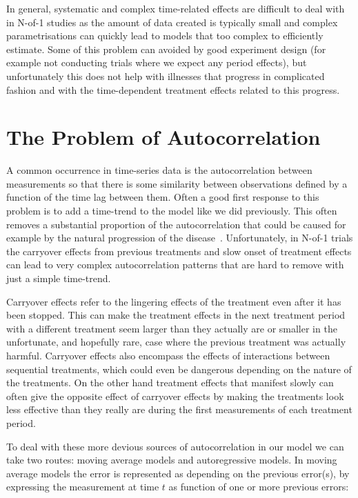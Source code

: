 \documentclass[12pt,a4paper,leqno]{report}
\theoremstyle{plain}
\theoremstyle{definition}
\theoremstyle{remark}
\begin{document}
In general, systematic and complex time-related effects are difficult to
deal with in N-of-1 studies as the amount of data created is typically small
and complex parametrisations can quickly lead to models that too complex to efficiently
estimate. Some of this problem can avoided by good experiment design (for example not
conducting trials where we expect any period effects), but unfortunately this does not
help with illnesses that progress in complicated fashion and with the time-dependent
treatment effects related to this progress.

\section{The Problem of Autocorrelation}\label{autocor}

A common occurrence in time-series data is the autocorrelation between
measurements so that there is some similarity between observations defined by a
function of the time lag between them. Often a good first response to this problem
is to add a time-trend to the model like we did previously. This
often removes a substantial proportion of the autocorrelation that could be
caused for example by the natural progression of the disease\ \cite{stat}.
Unfortunately, in N-of-1 trials the carryover effects
from previous treatments and slow onset of treatment effects can lead to very
complex autocorrelation patterns that are hard to remove with just a simple time-trend.

Carryover effects refer to the lingering effects of the treatment even after it
has been stopped. This can make the treatment effects in the next treatment period
with a different treatment seem larger than they actually are or smaller in the
unfortunate, and hopefully rare, case where the previous treatment was actually
harmful. Carryover effects also encompass the effects of interactions between
sequential treatments, which could even be dangerous depending on the nature of
the treatments. On the other hand treatment effects that manifest slowly can
often give the opposite effect of carryover effects by making the treatments
look less effective than they really are during the first measurements of each
treatment period.\cite{stat}

To deal with these more devious sources of autocorrelation in our model we can
take two routes: moving average models and autoregressive models. In moving
average models the error is represented as depending on the previous error(s), by
expressing the measurement at time \(t\) as function of one or more previous
errors:
\end{document}
